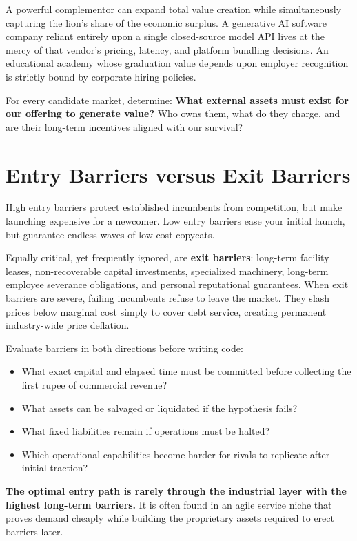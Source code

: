 A powerful complementor can expand total value creation while simultaneously capturing the lion's share of the economic surplus. A generative AI software company reliant entirely upon a single closed-source model API lives at the mercy of that vendor's pricing, latency, and platform bundling decisions. An educational academy whose graduation value depends upon employer recognition is strictly bound by corporate hiring policies.

For every candidate market, determine: \textbf{What external assets must exist for our offering to generate value?} Who owns them, what do they charge, and are their long-term incentives aligned with our survival?

\section{Entry Barriers versus Exit Barriers}

High entry barriers protect established incumbents from competition, but make launching expensive for a newcomer. Low entry barriers ease your initial launch, but guarantee endless waves of low-cost copycats.

Equally critical, yet frequently ignored, are \textbf{exit barriers}: long-term facility leases, non-recoverable capital investments, specialized machinery, long-term employee severance obligations, and personal reputational guarantees. When exit barriers are severe, failing incumbents refuse to leave the market. They slash prices below marginal cost simply to cover debt service, creating permanent industry-wide price deflation.

Evaluate barriers in both directions before writing code:
\begin{itemize}[leftmargin=12pt,itemsep=1pt,topsep=1pt]
  \item What exact capital and elapsed time must be committed before collecting the first rupee of commercial revenue?
  \item What assets can be salvaged or liquidated if the hypothesis fails?
  \item What fixed liabilities remain if operations must be halted?
  \item Which operational capabilities become harder for rivals to replicate after initial traction?
\end{itemize}

\textbf{The optimal entry path is rarely through the industrial layer with the highest long-term barriers.} It is often found in an agile service niche that proves demand cheaply while building the proprietary assets required to erect barriers later.

